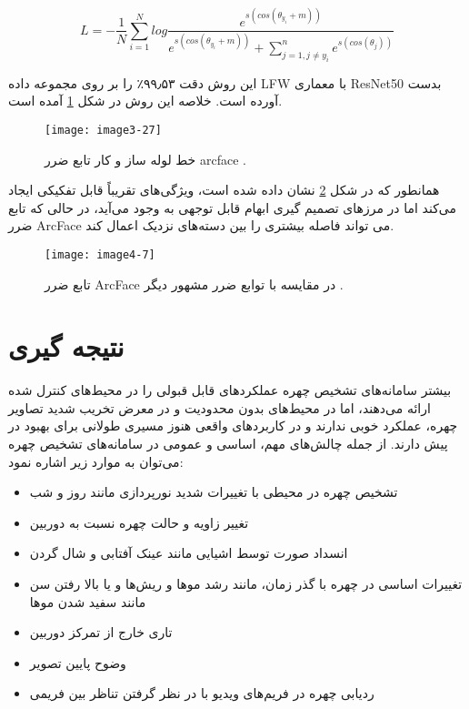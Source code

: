 \begin{equation}\label{eq3-16}
L = - \frac{1}{N} \sum_{i=1}^{N} log \frac{e^{s(cos(\theta_{y_i}+m))}}{e^{s(cos(\theta_{y_i}+m))} + \sum_{j=1, j\neq y_i}^{n} e^{s(cos(\theta_j))}}
\end{equation}

\noindent
این روش دقت ۹۹٫۵۳٪ را بر روی مجموعه داده LFW با معماری ResNet50 بدست آورده است. خلاصه این روش در شکل \ref{image3-27} آمده است.

\begin{figure}[h]
\centering
  \texttt{[image: image3-27]}
  \caption{خط لوله ساز و کار تابع ضرر arcface \cite{deng2019arcface}.}
  \label{image3-27}
\end{figure}

\noindent
همانطور که در شکل \ref{image4-7} نشان داده شده است،  ویژگی‌های تقریباً قابل تفکیکی ایجاد می‌کند اما در مرزهای تصمیم گیری ابهام قابل توجهی به وجود می‌آید، در حالی که تابع ضرر ArcFace می تواند فاصله بیشتری را بین دسته‌های نزدیک اعمال کند.
\begin{figure}[h]
	\centering
	\texttt{[image: image4-7]}
	\caption{تابع ضرر ArcFace در مقایسه با توابع ضرر مشهور دیگر \cite{deng2019arcface}.}
	\label{image4-7}
\end{figure}

\section{نتیجه گیری}
بیشتر سامانه‌های تشخیص چهره عملکردهای قابل قبولی را در محیط‌های کنترل شده ارائه می‌دهند، اما در محیط‌های بدون محدودیت و در معرض تخریب شدید تصاویر چهره، عملکرد خوبی ندارند و در کاربردهای واقعی هنوز مسیری طولانی برای بهبود در پیش دارند. از جمله چالش‌های مهم، اساسی و عمومی در سامانه‌های تشخیص چهره می‌توان به موارد زیر اشاره نمود:

\begin{itemize}
\item
تشخیص چهره در محیطی با تغییرات شدید نورپردازی مانند روز و شب 
 \item
تغییر زاویه و حالت چهره نسبت به دوربین 
 \item
انسداد صورت توسط اشیایی مانند عینک آفتابی و شال گردن 
 \item
تغییرات اساسی در چهره با گذر زمان، مانند رشد موها و ریش‌ها و یا بالا رفتن سن مانند سفید شدن موها 
 \item
تاری خارج از تمرکز دوربین 
 \item
وضوح پایین تصویر 
 \item
ردیابی چهره در فریم‌های ویدیو با در نظر گرفتن تناظر بین فریمی 
\end{itemize}

